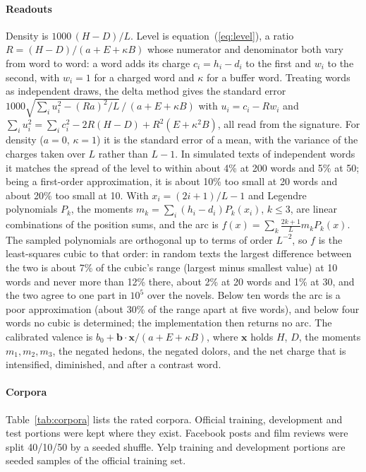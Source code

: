 \paragraph{Readouts}
Density is $1000\,(H-D)/L$. Level is equation~(\ref{eq:level}), a ratio $R=(H-D)/(a+E+\kappa B)$ whose numerator and denominator both vary from word to word: a word adds its charge $c_i=h_i-d_i$ to the first and $w_i$ to the second, with $w_i=1$ for a charged word and $\kappa$ for a buffer word. Treating words as independent draws, the delta method gives the standard error $1000\sqrt{\sum_iu_i^2-(Ra)^2/L}\,/\,(a+E+\kappa B)$ with $u_i=c_i-Rw_i$ and $\sum_iu_i^2=\sum_ic_i^2-2R(H-D)+R^2(E+\kappa^2B)$, all read from the signature. For density ($a=0$, $\kappa=1$) it is the standard error of a mean, with the variance of the charges taken over $L$ rather than $L-1$. In simulated texts of independent words it matches the spread of the level to within about 4\% at 200 words and 5\% at 50; being a first-order approximation, it is about 10\% too small at 20 words and about 20\% too small at 10. With $x_i=(2i+1)/L-1$ and Legendre polynomials $P_k$, the moments $m_k=\sum_i (h_i-d_i)P_k(x_i)$, $k\leq3$, are linear combinations of the position sums, and the arc is $f(x)=\sum_k\frac{2k+1}{L}m_kP_k(x)$. The sampled polynomials are orthogonal up to terms of order $L^{-2}$, so $f$ is the least-squares cubic to that order: in random texts the largest difference between the two is about 7\% of the cubic's range (largest minus smallest value) at 10 words and never more than 12\% there, about 2\% at 20 words and 1\% at 30, and the two agree to one part in $10^5$ over the novels. Below ten words the arc is a poor approximation (about 30\% of the range apart at five words), and below four words no cubic is determined; the implementation then returns no arc. The calibrated valence is $b_0+\mathbf{b}\cdot\mathbf{x}/(a+E+\kappa B)$, where $\mathbf{x}$ holds $H$, $D$, the moments $m_1,m_2,m_3$, the negated hedons, the negated dolors, and the net charge that is intensified, diminished, and after a contrast word.

\paragraph{Corpora}
Table~\ref{tab:corpora} lists the rated corpora. Official training, development and test portions were kept where they exist. Facebook posts and film reviews were split 40/10/50 by a seeded shuffle. Yelp training and development portions are seeded samples of the official training set.

